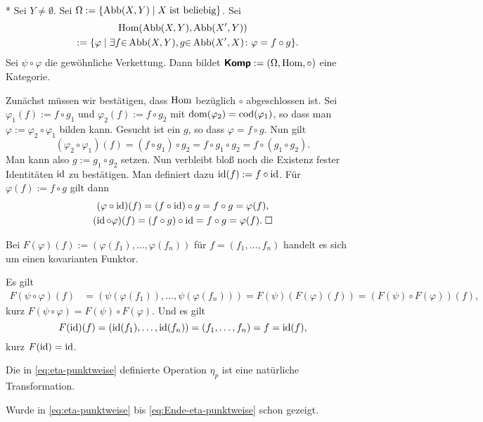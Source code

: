 \begin{Satz}\mbox{}\\*
Sei $Y\ne\emptyset$. Sei $\Omega:=\{\operatorname{Abb}(X,Y)\mid X\;\text{ist beliebig}\}$.
Sei%
\begin{gather*}\operatorname{Hom}(\operatorname{Abb}(X,Y),\operatorname{Abb}(X',Y))\\
\quad := \{\varphi\mid\exists f{\in}\operatorname{Abb}(X,Y), g{\in}\operatorname{Abb}(X',X)\colon
\varphi = f\circ g\}.
\end{gather*}
Sei $\psi\circ \varphi$ die gewöhnliche Verkettung. Dann bildet
$\textsf{\textbf{Komp}}:=(\Omega,\operatorname{Hom},\circ)$ eine Kategorie.
\end{Satz}
Zunächst müssen wir bestätigen, dass $\operatorname{Hom}$ bezüglich
$\circ$ abgeschlossen ist. Sei $\varphi_1(f):=f\circ g_1$ und
$\varphi_2(f):=f\circ g_2$ mit $\operatorname{dom}(\varphi_2)=\operatorname{cod}(\varphi_1)$, so
dass man $\varphi:=\varphi_2\circ\varphi_1$ bilden kann.
Gesucht ist ein $g$, so dass $\varphi = f\circ g$. Nun gilt%
\begin{equation}
(\varphi_2\circ\varphi_1)(f) = (f\circ g_1)\circ g_2
= f\circ g_1\circ g_2 = f\circ (g_1\circ g_2).
\end{equation}
Man kann also $g:=g_1\circ g_2$ setzen. Nun verbleibt bloß noch die
Existenz fester Identitäten $\operatorname{id}$ zu bestätigen. Man definiert dazu
$\operatorname{id}(f):=f\circ\operatorname{id}$. Für $\varphi(f):=f\circ g$ gilt dann%
\begin{gather}
(\varphi\circ\operatorname{id})(f) = (f\circ \operatorname{id})\circ g = f\circ g = \varphi(f),\\
(\operatorname{id}\circ\varphi)(f) = (f\circ g)\circ\operatorname{id} = f\circ g = \varphi(f).\;\Box
\end{gather}
\begin{Satz}
Bei $F(\varphi)(f):=(\varphi(f_1),\ldots,\varphi(f_n))$ für
$f=(f_1,\ldots,f_n)$ handelt es sich um einen kovarianten Funktor.
\end{Satz}
 Es gilt
\begin{align}
F(\psi\circ\varphi)(f) &= (\psi(\varphi(f_1)),\ldots,\psi(\varphi(f_n)))
= F(\psi)(F(\varphi)(f))
= (F(\psi)\circ F(\varphi))(f),
\end{align}
kurz $F(\psi\circ\varphi) = F(\psi)\circ F(\varphi)$. Und es gilt
\begin{equation}
F(\operatorname{id})(f) = (\operatorname{id}(f_1),\ldots,\operatorname{id}(f_n)) = (f_1,\ldots,f_n) = f = \operatorname{id}(f),
\end{equation}
kurz $F(\operatorname{id}) = \operatorname{id}$.\;\qedsymbol
\begin{Satz}
Die in \eqref{eq:eta-punktweise} definierte Operation $\eta_p$ ist
eine natürliche Transformation.
\end{Satz}
 Wurde in \eqref{eq:eta-punktweise} bis
\eqref{eq:Ende-eta-punktweise} schon gezeigt.\;\qedsymbol

